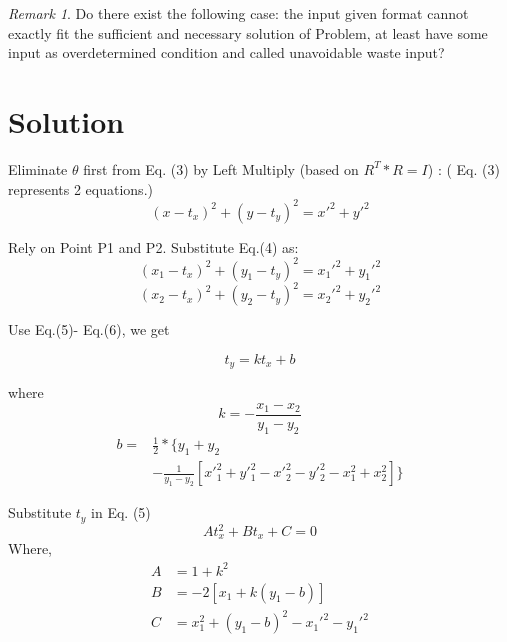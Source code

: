 \documentclass[letterpaper, 10 pt, conference]{ieeeconf}  %
\theoremstyle{remark}
\newtheorem{myrem}{Remark}
\begin{document}
\begin{myrem}
Do there exist the following case: the input given format cannot exactly fit the sufficient and necessary solution of Problem, at least have some input as overdetermined condition and called unavoidable waste input?
\end{myrem}


\section{Solution}
Eliminate $\theta$ first from Eq. (3) by Left Multiply (based on $R^T*R=I$) :
( Eq. (3) represents 2 equations.)
\begin{equation}
(x-t_x)^2 + (y-t_y)^2 = {x'}^2 + {y'}^2
\end{equation}

Rely on Point P1 and P2.  Substitute Eq.(4) as:
\begin{equation}
(x_1-t_x)^2 + (y_1-t_y)^2 = {x_1'}^2 + {y_1'}^2 
\end{equation}
\begin{equation}
(x_2-t_x)^2 + (y_2-t_y)^2 = {x_2'}^2 + {y_2'}^2
\end{equation}

Use Eq.(5)- Eq.(6), we get

\begin{equation}
t_y=k t_x + b
\end{equation}

where
\begin{equation}
k=-\frac{x_1 - x_2}{y_1 - y_2}
\end{equation}
\begin{equation}
\begin{aligned}
b=&{\frac{1}{2}}*\{ y_1 + y_2 \\
&- {\frac{1}{y_1 - y_2}}[x'_1^2 + y'_1^2 - x'_2^2 -y'_2^2 -x_1^2 + x_2^2]\}
\end{aligned}
\end{equation}

Substitute $t_y$ in Eq. (5)
\begin{equation}
At_x^2 + Bt_x + C =0
\end{equation}
Where,
\begin{equation}
\begin{aligned}
A&=1+k^2 \\
B&=-2[x_1 + k(y_1 -b)]\\
C&= x_1^2 + (y_1 -b)^2 - x_1'^2 - y_1'^2
\end{aligned}
\end{equation}
\end{document}
